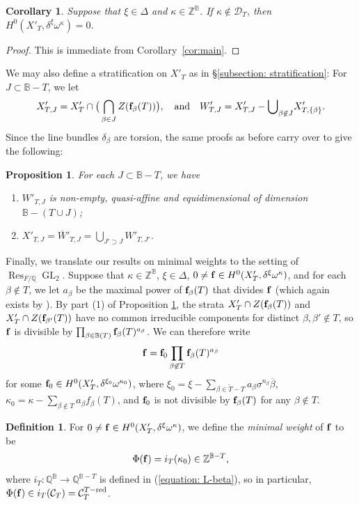 \documentclass[11pt,pdflatex]{amsart}
\theoremstyle{plain}
\theoremstyle{definition}
\newcommand{\QQ}{\mathbf{Q}}
\newcommand{\ZZ}{\mathbf{Z}}
\theoremstyle{plain}
\newtheorem{prop}[theorem]{Proposition}
\newtheorem{cor}[theorem]{Corollary}
\theoremstyle{definition}
\newtheorem{dfn}[theorem]{Definition}
\theoremstyle{remark}
\numberwithin{equation}{section}
\numberwithin{figure}{section} \numberwithin{table}{subsection}
\newcommand{\Res}{{\operatorname{Res }}}
\newcommand{\GL}{{\operatorname{GL}}}
\newcommand{\calC}{{\mathcal{C}}}
\def\BB{\mathbb{B}}
\def\QQ{\mathbb{Q}}
\def\ZZ{\mathbb{Z}}
\begin{document}
\begin{cor} \label{cor:vanishing} Suppose that $\xi \in \Delta$ and $\kappa \in \ZZ^{\BB}$.  If $\kappa\not\in \mathcal{D}_T$, then $H^0(X'_T,\delta^\xi\omega^\kappa) = 0$.
\end{cor}
\begin{proof} This is immediate from Corollary~\ref{cor:main}.
\end{proof}

We may also define a stratification on $X'_T$ as in \S\ref{subsection: stratification}: For $J \subset \BB - T$, we let
$$X'_{T,J}=X'_T \cap \big(\bigcap_{\beta \in J} Z({\bf f}_\beta(T))\big),\quad\mbox{and}\quad
W'_{T,J}=X'_{T,J}-{\bigcup}_{\beta \not \in J} X'_{T,\{\beta\}}.$$
Since the line bundles $\delta_\beta$ are torsion, the same proofs as before carry over to give the following: 
\begin{prop} \label{prop:strata'}
For each $J \subset \BB - T$, we have
\begin{enumerate}
\item $W'_{T,J}$ is non-empty, quasi-affine and equidimensional of dimension $\BB - (T \cup J)$;
\item $X'_{T,J} = \overline{W}'_{T,J} = \bigcup_{J' \supset J} W'_{T,J'}$.
\end{enumerate}
\end{prop}

 Finally, we translate our results on minimal weights to the setting of $\Res_{F/\QQ} \GL_2$.  Suppose that $\kappa \in \ZZ^{\BB}$, $\xi \in \Delta$, $0 \neq {\bf f} \in H^0(X'_T,\delta^\xi\omega^\kappa)$, and for each $\beta \not\in T$, we let $a_\beta$ be the maximal power of ${\bf f}_\beta(T)$ that divides $\bf f$ (which again exists by \cite[Lemma~7.2]{DK2}).   
By part (1) of Proposition \ref{prop:strata'}, the strata $X'_T \cap Z({\bf f}_\beta(T))$ and $X'_T \cap Z({\bf f}_{\beta'}(T))$ have no common irreducible components for distinct $\beta,\beta'\not\in T$, so ${\bf f}$ is divisible by $\prod_{\beta \in \BB(T)} {\bf f}_\beta(T)^{a_\beta}$. We can therefore write 
$${\bf f} ={\bf f}_0\prod_{\beta \not\in T} {\bf f}_\beta(T)^{a_\beta}$$ 
for some ${\bf f}_0 \in H^0(X'_T,\delta^{\xi_0}\omega^{\kappa_0})$,
where $\xi_0 = \xi - \sum_{\beta\in \widetilde{T}-T} a_\beta\sigma^{n_\beta}\overline{\beta}$, $\kappa_0 = \kappa - \sum_{\beta\not\in T} a_\beta f_\beta(T)$, and ${\bf f}_0$ is not divisible by ${\bf f}_\beta(T)$ for any $\beta \not\in T$.

\begin{dfn}  For $0 \neq {\bf f} \in H^0(X'_T,\delta^\xi\omega^\kappa)$, we define the {\em minimal weight} of ${\bf f}$ to be
\[
\Phi({\bf f})=i_T(\kappa_0) \in \ZZ^{\BB - T},
\]
where $i_T: \QQ^{\BB} \to \QQ^{\BB - T}$ is defined in (\ref{equation: L-beta}), so in particular, $\Phi({\bf f}) \in i_T(\calC_T) = \calC_T^{T-\rm red}$.
\end{dfn}
\end{document}
